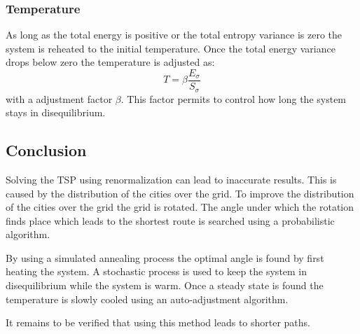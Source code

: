 \subsubsection{Temperature}
As long as the total energy is positive or the total entropy variance is zero
the system is reheated to the initial temperature. Once the total energy
variance drops below zero the temperature is adjusted as:
\begin{equation}\label{eq:tempadj}
T = \beta\frac{E_\sigma}{S_\sigma}
\end{equation}
with a adjustment factor $\beta$. This factor permits to control how long the
system stays in disequilibrium. 

\subsection{Conclusion}
Solving the TSP using renormalization can lead to inaccurate results. This is
caused by the distribution of the cities over the grid. To improve the
distribution of the cities over the grid the grid is rotated. The angle under
which the rotation finds place which leads to the shortest route is searched
using a probabilistic algorithm. 

By using a simulated annealing process the optimal angle is found by first
heating the system. A stochastic process is used to keep the system in
disequilibrium while the system is warm. Once a steady state is found the
temperature is slowly cooled using an auto-adjustment algorithm.

It remains to be verified that using this method leads to shorter paths.


